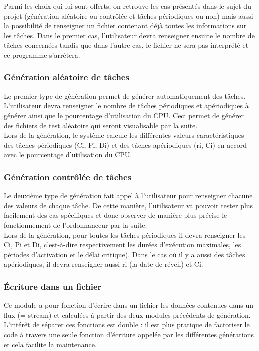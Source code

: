 				Parmi les choix qui lui sont offerts, on retrouve les cas présentés dans le sujet du projet (génération aléatoire ou contrôlée et tâches périodiques ou non) mais aussi la possibilité de renseigner un fichier contenant déjà toutes les informations sur les tâches. Dans le premier cas, l’utilisateur devra renseigner ensuite le nombre de tâches concernées tandis que dans l’autre cas, le fichier ne sera pas interprété et ce programme s’arrêtera.


			\subsubsection{Génération aléatoire de tâches}
				Le premier type de génération permet de générer automatiquement des tâches. L'utilisateur devra renseigner le nombre de tâches périodiques et apériodiques à générer ainsi que le pourcentage d'utilisation du CPU. Ceci permet de générer des fichiers de test aléatoire qui seront visualisable par la suite.\\
				Lors de la génération, le système calcule les différentes valeurs caractéristiques des tâches périodiques (Ci, Pi, Di) et des tâches apériodiques (ri, Ci) en accord avec le pourcentage d'utilisation du CPU. 

			\subsubsection{Génération contrôlée de tâches}
				Le deuxième type de génération fait appel à l'utilisateur pour renseigner chacune des valeurs de chaque tâche. De cette manière, l'utilisateur va pouvoir tester plus facilement des cas spécifiques et donc observer de manière plus précise le fonctionnement de l'ordonnanceur par la suite. \\
				Lors de la génération, pour toutes les tâches périodiques il devra renseigner les Ci, Pi et Di, c'est-à-dire respectivement les durées d'exécution maximales, les périodes d'activation et le délai critique). Dans le cas où il y a aussi des tâches apériodiques, il devra renseigner aussi ri (la date de réveil) et Ci.

			\subsubsection{Écriture dans un fichier}
				Ce module a pour fonction d’écrire dans un fichier les données contenues dans un flux (= stream)  et calculées à partir des deux modules précédents de génération. L’intérêt de séparer ces fonctions est double : il est plus pratique de factoriser le code à travers une seule fonction d’écriture appelée par les différentes générations et cela facilite la maintenance.


